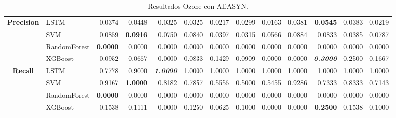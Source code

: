 \begin{table}[H]
\begin{adjustbox}{max width=12cm}
\begin{tabular}{|c|l|r|r|r|r|r|r|r|r|r|r|r|}
			\hline
			\textbf{Precision} &  LSTM &  0.0374 &  0.0448 &  0.0325 &  0.0325 &  0.0217 &  0.0299 &  0.0163 &  0.0381 & \textbf{  0.0545 } &  0.0383 &  0.0219 \\
			&  SVM &  0.0859 & \textbf{  0.0916 } &  0.0750 &  0.0840 &  0.0397 &  0.0315 &  0.0566 &  0.0884 &  0.0833 &  0.0385 &  0.0787 \\
			&  RandomForest & \textbf{  0.0000 } &  0.0000 &  0.0000 &  0.0000 &  0.0000 &  0.0000 &  0.0000 &  0.0000 &  0.0000 &  0.0000 &  0.0000 \\
			&  XGBoost &  0.0952 &  0.0667 &  0.0000 &  0.0833 &  0.1429 &  0.0909 &  0.0000 &  0.0000 & \textit{ \textbf{  0.3000 } } &  0.2500 &  0.1667 \\
			\hline
			\textbf{Recall} &  LSTM &  0.7778 &  0.9000 & \textit{ \textbf{  1.0000 } } &  1.0000 &  1.0000 &  1.0000 &  1.0000 &  1.0000 &  1.0000 &  1.0000 &  1.0000 \\
			&  SVM &  0.9167 & \textbf{  1.0000 } &  0.8182 &  0.7857 &  0.5556 &  0.5000 &  0.5455 &  0.9286 &  0.7333 &  0.8333 &  0.7143 \\
			&  RandomForest & \textbf{  0.0000 } &  0.0000 &  0.0000 &  0.0000 &  0.0000 &  0.0000 &  0.0000 &  0.0000 &  0.0000 &  0.0000 &  0.0000 \\
			&  XGBoost &  0.1538 &  0.1111 &  0.0000 &  0.1250 &  0.0625 &  0.1000 &  0.0000 &  0.0000 & \textbf{  0.2500 } &  0.1538 &  0.1000 \\
			\hline
		\end{tabular}
	\end{adjustbox}
	\caption{Resultados Ozone con ADASYN.}
	\label{tab:Ozone_ADASYN}
\end{table}

